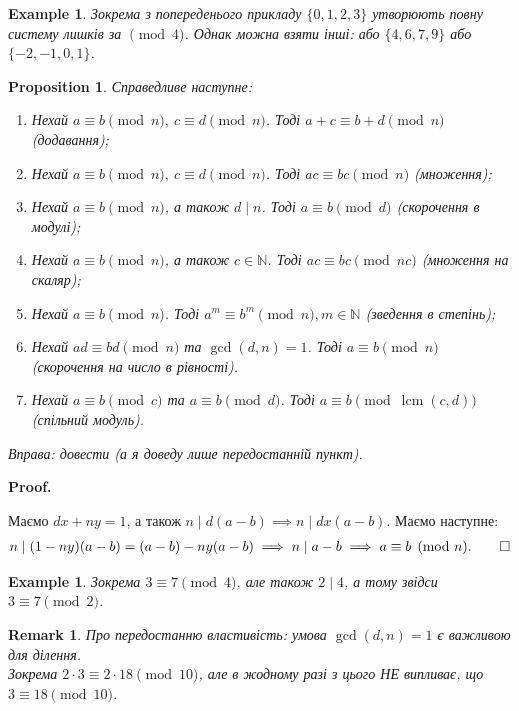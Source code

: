 \documentclass[a4paper, 10pt]{article}
\makeatletter
\theoremstyle{theoremdd}
\theoremstyle{theoremdd}
\theoremstyle{theoremdd}
\theoremstyle{theoremdd}
\newtheorem{example}[theorem]{Example}
\theoremstyle{theoremdd}
\newtheorem{proposition}[theorem]{Proposition}
\theoremstyle{theoremdd}
\newtheorem{remark}[theorem]{Remark}
\theoremstyle{theoremdd}
\theoremstyle{theoremdd}
\renewenvironment{proof}[1][Proof.\\]{\par
\pushQED{\hfill \qed}%
\normalfont \topsep6\p@\@plus6\p@\relax
\trivlist
\item\relax
{\bfseries
#1\@addpunct{.}}\hspace\labelsep\ignorespaces
}{%
\popQED\endtrivlist\@endpefalse
}
\DeclareMathOperator{\lcm}{lcm}
\makeatother
\begin{document}
\begin{example}
Зокрема з попереденього прикладу $\{0,1,2,3\}$ утворюють повну систему лишків за $\!\! \pmod 4$. Однак можна взяти інші: або $\{4,6,7,9\}$ або $\{-2,-1,0,1\}$.
\end{example}

\begin{proposition}
Справедливе наступне:
\begin{enumerate}[nosep,wide=0pt,label={\arabic*)}]
\item Нехай $a \equiv b \pmod n,\ c \equiv d \pmod n$. Тоді $a + c \equiv b + d \pmod n$ (\textit{додавання});
\item Нехай $a \equiv b \pmod n,\ c \equiv d \pmod n$. Тоді $ac \equiv bc \pmod n$ (\textit{множення});
\item Нехай $a \equiv b \pmod n$, а також $d \mid n$. Тоді $a \equiv b \pmod d$ (\textit{скорочення в модулі});
\item Нехай $a \equiv b \pmod n$, а також $c \in \mathbb{N}$. Тоді $ac \equiv bc \pmod {nc}$ (\textit{множення на скаляр});
\item Нехай $a \equiv b \pmod n$. Тоді $a^m \equiv b^m \pmod n, m \in \mathbb{N}$ (\textit{зведення в степінь});
\item Нехай $ad \equiv bd \pmod n$ та $\gcd(d,n) = 1$. Тоді $a \equiv b \pmod n$ (\textit{скорочення на число в рівності}).
\item Нехай $a \equiv b \pmod c$ та $a \equiv b \pmod d$. Тоді $a \equiv b \pmod {\lcm(c,d)}$ (\textit{спільний модуль}).
\end{enumerate}
\textit{Вправа: довести (а я доведу лише передостанній пункт).}
\end{proposition}

\begin{proof}
Маємо $dx+ny = 1$, а також $n \mid d(a-b) \implies n \mid dx(a-b)$. Маємо наступне:
\begin{gather*}
n \mid (1-ny)(a-b) = (a-b) - ny(a-b) \implies n \mid a-b \implies a \equiv b \pmod n. \qedhere
\end{gather*}
\end{proof}

\begin{example}
Зокрема $3 \equiv 7 \pmod 4$, але також $2 \mid 4$, а тому звідси $3 \equiv 7 \pmod 2$.
\end{example}

\begin{remark}
Про передостанню властивість: умова $\gcd(d,n) = 1$ є важливою для ділення. \\
Зокрема $2 \cdot 3 \equiv 2 \cdot 18 \pmod {10}$, але в жодному разі з цього НЕ випливає, що $3 \equiv 18 \pmod {10}$.
\end{remark}
\end{document}
